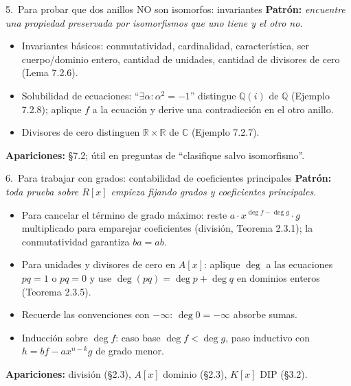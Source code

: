 \documentclass[11pt,twoside]{article}
\newcommand{\R}{\mathbb{R}}
\newcommand{\Q}{\mathbb{Q}}
\newcommand{\C}{\mathbb{C}}
\begin{document}
\begin{strategybox}{5.\ Para probar que dos anillos NO son isomorfos: invariantes}
\textbf{Patrón:} \textit{encuentre una propiedad preservada por isomorfismos que uno tiene y el otro no.}
\begin{itemize}[leftmargin=1.5em]
\item Invariantes básicos: conmutatividad, cardinalidad, característica, ser cuerpo/dominio entero, cantidad de unidades, cantidad de divisores de cero (Lema 7.2.6).
\item Solubilidad de ecuaciones: ``$\exists \alpha : \alpha^{2} = -1$'' distingue $\Q(i)$ de $\Q$ (Ejemplo 7.2.8); aplique $f$ a la ecuación y derive una contradicción en el otro anillo.
\item Divisores de cero distinguen $\R \times \R$ de $\C$ (Ejemplo 7.2.7).
\end{itemize}
\textbf{Apariciones:} §7.2; útil en preguntas de ``clasifique salvo isomorfismo''.
\end{strategybox}

\begin{strategybox}{6.\ Para trabajar con grados: contabilidad de coeficientes principales}
\textbf{Patrón:} \textit{toda prueba sobre $R[x]$ empieza fijando grados y coeficientes principales.}
\begin{itemize}[leftmargin=1.5em]
\item Para cancelar el término de grado máximo: reste $a \cdot x^{\deg f - \deg g} \cdot g$ multiplicado para emparejar coeficientes (división, Teorema 2.3.1); la conmutatividad garantiza $ba = ab$.
\item Para unidades y divisores de cero en $A[x]$: aplique $\deg$ a las ecuaciones $pq = 1$ o $pq = 0$ y use $\deg(pq) = \deg p + \deg q$ en dominios enteros (Teorema 2.3.5).
\item Recuerde las convenciones con $-\infty$: $\deg 0 = -\infty$ absorbe sumas.
\item Inducción sobre $\deg f$: caso base $\deg f < \deg g$, paso inductivo con $h = bf - a x^{n-k} g$ de grado menor.
\end{itemize}
\textbf{Apariciones:} división (§2.3), $A[x]$ dominio (§2.3), $K[x]$ DIP (§3.2).
\end{strategybox}
\end{document}
